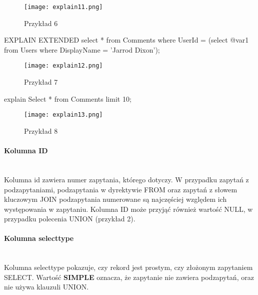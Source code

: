 \begin{figure}[H]
	\texttt{[image: explain11.png]} 
	\caption{Przykład 6}
\end{figure}
\begin{spverbatim}
	EXPLAIN EXTENDED select * from Comments where UserId = (select @var1 from Users where DisplayName = 'Jarrod Dixon');
\end{spverbatim}
\begin{figure}[H]
	\texttt{[image: explain12.png]} 
	\caption{Przykład 7}
\end{figure}
\begin{spverbatim}
explain Select * from Comments limit 10;
\end{spverbatim}
\begin{figure}[H]
	\texttt{[image: explain13.png]} 
	\caption{Przykład 8}
\end{figure}

\paragraph{Kolumna ID}\leavevmode\\
Kolumna id zawiera numer zapytania, którego dotyczy. W przypadku zapytań z podzapytaniami, podzapytania w dyrektywie FROM oraz zapytań z słowem kluczowym JOIN podzapytania numerowane są najczęściej względem ich występowania w zapytaniu. Kolumna ID może przyjąć również wartość NULL, w przypadku polecenia UNION (przykład 2).

\paragraph{Kolumna select\textunderscore type}\leavevmode\\
Kolumna select\textunderscore type pokazuje, czy rekord jest prostym, czy złożonym zapytaniem SELECT. 
Wartość \textbf{SIMPLE} oznacza, że zapytanie nie zawiera podzapytań, oraz nie używa klauzuli UNION.

